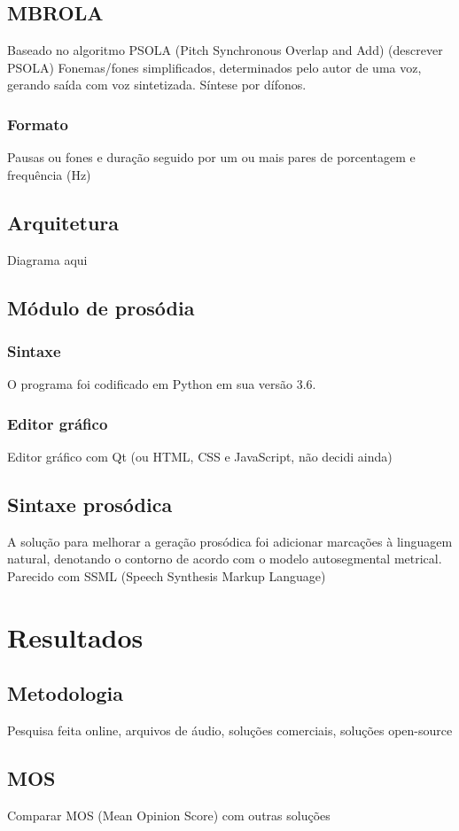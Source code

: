 \subsection{MBROLA}
Baseado no algoritmo PSOLA (Pitch Synchronous Overlap and Add) (descrever PSOLA)
Fonemas/fones simplificados, determinados pelo autor de uma voz, gerando saída
com voz sintetizada. Síntese por dífonos.
\subsubsection{Formato}
Pausas ou fones e duração seguido por um ou mais pares de porcentagem e frequência (Hz)
\subsection{Arquitetura}
Diagrama aqui
\subsection{Módulo de prosódia}
\subsubsection{Sintaxe}
O programa foi codificado em Python em sua versão 3.6.
\subsubsection{Editor gráfico}
Editor gráfico com Qt (ou HTML, CSS e JavaScript, não decidi ainda)
\subsection{Sintaxe prosódica}
A solução para melhorar a geração prosódica foi adicionar marcações à linguagem
natural, denotando o contorno de acordo com o modelo autosegmental metrical.
Parecido com SSML (Speech Synthesis Markup Language)

\section{Resultados}
\subsection{Metodologia}
Pesquisa feita online, arquivos de áudio, soluções comerciais, soluções open-source
\subsection{MOS}
Comparar MOS (Mean Opinion Score) com outras soluções

